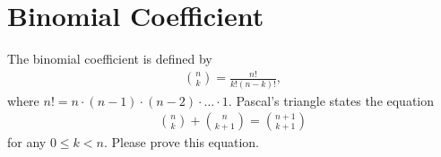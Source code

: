 \section{Binomial Coefficient}
The binomial coefficient is defined by
\begin{align*}
\binom{n}{k} = \frac{n!}{k!(n-k)!},
\end{align*}
where $n! = n\cdot(n-1)\cdot(n-2)\cdot\dots \cdot1$.
Pascal's triangle states the equation
\begin{align*}
\binom{n}{k} + \binom{n}{k+1} = \binom{n+1}{k+1}
\end{align*}
for any $0 \leq k < n$.
Please prove this equation.